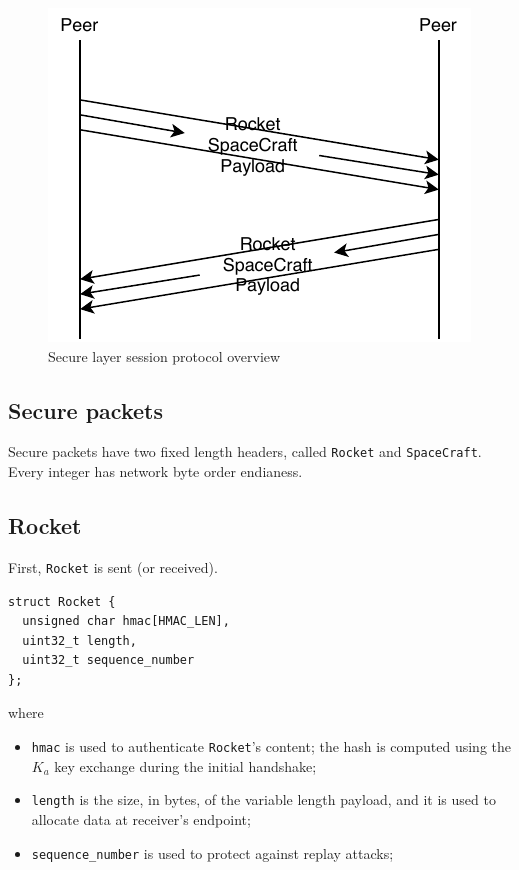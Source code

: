 \documentclass[a4paper,12pt]{article}
\begin{document}
\begin{figure}[H]
\centering
\includegraphics{img/secure-session-protocol.pdf}
\caption{Secure layer session protocol overview}
\label{img:secure-session-protocol}
\end{figure}

\subsection{Secure packets}
Secure packets have two fixed length headers, called \texttt{Rocket} and \texttt{SpaceCraft}.
Every integer has network byte order endianess.

\subsection{Rocket}
First, \texttt{Rocket} is sent (or received).

\begin{verbatim}
struct Rocket {
  unsigned char hmac[HMAC_LEN],
  uint32_t length,
  uint32_t sequence_number
};
\end{verbatim}

where

\begin{itemize}
  \item \texttt{hmac} is used to authenticate \texttt{Rocket}'s content; the hash is computed using the $K_a$ key exchange during the initial handshake;
  \item \texttt{length} is the size, in bytes, of the variable length payload, and it is used to allocate data at receiver's endpoint;
  \item \texttt{sequence\_number} is used to protect against replay attacks;
\end{itemize}
\end{document}
